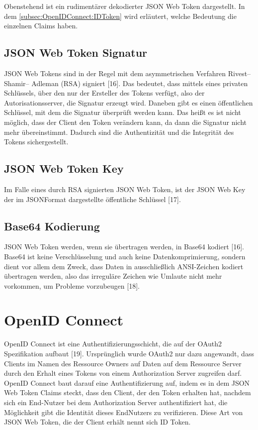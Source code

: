 Obenstehend ist ein rudimentärer dekodierter JSON Web Token dargestellt. In dem \autoref{subsec:OpenIDConnect:IDToken}
wird erläutert, welche Bedeutung die einzelnen Claims haben.

\subsection{JSON Web Token Signatur}
\label{sec:JSONWebToken:JSONWebTokenSignatur}

JSON Web Tokens sind in der Regel mit dem asymmetrischen Verfahren Rivest–Shamir–
Adleman (RSA) signiert [16]. Das bedeutet, dass mittels eines privaten Schlüssels, über den
nur der Ersteller des Tokens verfügt, also der Autorisationsserver, die Signatur erzeugt wird.
Daneben gibt es einen öffentlichen Schlüssel, mit dem die Signatur überprüft werden kann.
Das heißt es ist nicht möglich, dass der Client den Token verändern kann, da dann die
Signatur nicht mehr übereinstimmt. Dadurch sind die Authentizität und die Integrität des
Tokens sichergestellt.

\subsection{JSON Web Token Key}
\label{sec:JSONWebToken:JSONWebTokenKey}
Im Falle eines durch RSA signierten JSON Web Token, ist der JSON Web Key der im JSONFormat dargestellte öffentliche Schlüssel [17]. 

\subsection{Base64 Kodierung}
\label{sec:JSONWebToken:Base64Kodierung}
JSON Web Token werden, wenn sie übertragen werden, in Base64 kodiert [16]. Base64 ist
keine Verschlüsselung und auch keine Datenkomprimierung, sondern dient vor allem dem
Zweck, dass Daten in ausschließlich ANSI-Zeichen kodiert übertragen werden, also das
irreguläre Zeichen wie Umlaute nicht mehr vorkommen, um Probleme vorzubeugen [18]. 

\section{OpenID Connect}
\label{sec:OpenIDConnect}
OpenID Connect ist eine Authentifizierungsschicht, die auf der OAuth2 Spezifikation
aufbaut [19].
Ursprünglich wurde OAuth2 nur dazu angewandt, dass Clients im Namen des Ressource
Owners auf Daten auf dem Ressource Server durch den Erhalt eines Tokens von einem
Authorization Server zugreifen darf.
OpenID Connect baut darauf eine Authentifizierung auf, indem es in dem JSON Web Token
Claims steckt, dass den Client, der den Token erhalten hat, nachdem sich ein End-Nutzer bei
dem Authorization Server authentifiziert hat, die Möglichkeit gibt die Identität dieses EndNutzers zu verifizieren.
Diese Art von JSON Web Token, die der Client erhält nennt sich ID Token. 

